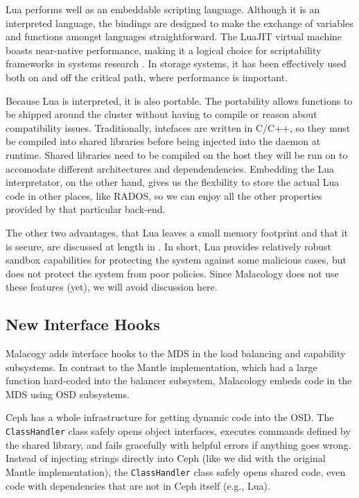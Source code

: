 \documentclass[10pt,twocolumn]{article}
\begin{document}
Lua performs well as an embeddable scripting language. Although it is an
interpreted language, the bindings are designed to make the exchange of
variables and functions amongst languages straightforward. The LuaJIT
virtual machine boasts near-native performance, making it a logical
choice for scriptability frameworks in systems research
\cite{neto:dls14-luaos}. In storage systems, it has been effectively
used both on \cite{grawinkel:pdsw2012-lua,watkins2013:bdmc13-in-vivo} and off
\cite{sevilla:sc15-mantle} the critical path, where performance is
important.

Because Lua is interpreted, it is also portable. The portability allows
functions to be shipped around the cluster without having to compile or
reason about compatibility issues. Traditionally, intefaces are written
in C/C++, so they must be compiled into shared libraries before being
injected into the daemon at runtime. Shared libraries need to be
compiled on the host they will be run on to accomodate different
architectures and dependendencies. Embedding the Lua interpretator, on
the other hand, gives us the flexbility to store the actual Lua code in
other places, like RADOS, so we can enjoy all the other properties
provided by that particular back-end.

The other two advantages, that Lua leaves a small memory footprint and
that it is secure, are discussed at length in 
\cite{ierusalimschy_programming_2006,neto:dls14-luaos}. In short, Lua
provides relatively robust sandbox capabilities for protecting the
system against some malicious cases, but does not protect the system
from poor policies. Since Malacology does not use these features (yet),
we will avoid discussion here.

\subsection{New Interface Hooks}\label{new-interface-hooks}

Malacogy adds interface hooks to the MDS in the load balancing and
capability subsystems. In contrast to the Mantle implementation, which
had a large function hard-coded into the balancer subsystem, Malacology
embeds code in the MDS using OSD subsystems.

Ceph has a whole
infrastructure for getting dynamic code into the OSD. The
\texttt{ClassHandler} class safely opens object interfaces, executes
commands defined by the shared library, and fails gracefully with
helpful errors if anything goes wrong. Instead of injecting strings
directly into Ceph (like we did with the original Mantle
implementation), the \texttt{ClassHandler} class safely opens shared
code, even code with dependencies that are not in Ceph itself (e.g.,
Lua).
\end{document}
